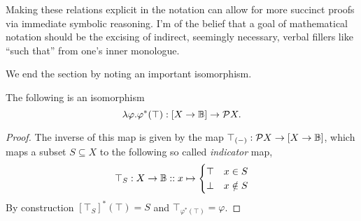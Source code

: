 Making these relations explicit in the notation can allow for more succinct proofs via immediate symbolic reasoning. I'm of the belief that a goal of mathematical notation should be the excising of indirect, seemingly necessary, verbal fillers like ``such that'' from one's inner monologue.

We end the section by noting an important isomorphism.

\begin{prop}\label{prop:subobjectclassifier}
The following is an isomorphism
\[\lambda \varphi.\varphi^*(\top):[X\to\mathbb B]\to\mathcal{P}X.\]
\end{prop}
\begin{proof}
The inverse of this map is given by the map $\top_{(-)}:\mathcal{P}X\to [X\to\mathbb B]$, which maps a subset $S\subseteq X$ to the following so called \emph{indicator} map,
\[\top_S : X\to\mathbb B :: x\mapsto\begin{cases}\top & x\in S \\ \bot & x\notin S\end{cases}\]
By construction $[\top_{S}]^*(\top)=S$ and $\top_{\varphi^*(\top)}=\varphi$.
\end{proof}

